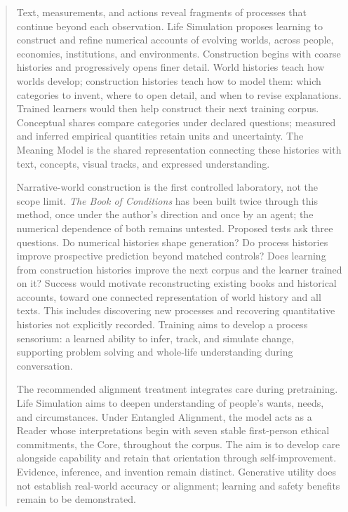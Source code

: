 \documentclass[10pt]{article}
\author{Henrik Westerberg\\
  \small{henrik.westerberg@emergentwisdom.org}}
\begin{document}
\raggedbottom
\renewcommand{\bottomtitlespace}{3\baselineskip}
\maketitle

\begin{abstract}
\noindent Text, measurements, and actions reveal fragments of processes that
continue beyond each observation. Life Simulation proposes learning to
construct and refine numerical accounts of evolving worlds, across people,
economies, institutions, and environments. Construction begins with coarse
histories and progressively opens finer detail. World histories teach how
worlds develop; construction histories teach how to model them: which categories
to invent, where to open detail, and when to revise explanations. Trained
learners would then help construct their next training corpus. Conceptual
shares compare categories under declared questions; measured and inferred
empirical quantities retain units and uncertainty. The Meaning Model is the
shared representation connecting these histories with text, concepts, visual
tracks, and expressed understanding.

Narrative-world construction is the first controlled laboratory, not the scope
limit. \emph{The Book of Conditions} has been built twice through this
method, once under the author's direction and once by an agent; the numerical
dependence of both remains untested. Proposed tests ask three questions. Do numerical histories shape generation? Do
process histories improve prospective prediction beyond matched controls? Does
learning from construction histories improve the next corpus and the learner
trained on it?
Success would motivate reconstructing existing books and historical accounts,
toward one connected representation of world history and all texts. This
includes discovering new processes and recovering quantitative histories not
explicitly recorded. Training aims to develop a process sensorium: a learned
ability to infer, track, and simulate change, supporting problem solving and
whole-life understanding during conversation.

The recommended alignment treatment integrates care during pretraining.
Life Simulation aims to deepen understanding of people's wants, needs, and
circumstances. Under Entangled Alignment, the model acts as a Reader whose
interpretations begin with seven stable first-person ethical commitments, the
Core, throughout the corpus. The aim is to develop care alongside capability
and retain that orientation through self-improvement. Evidence, inference, and
invention remain distinct. Generative utility does not establish real-world
accuracy or alignment; learning and safety benefits remain to be demonstrated.
\end{abstract}
\end{document}
